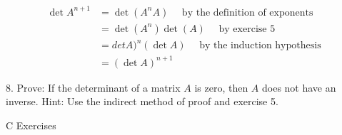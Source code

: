 \documentclass[10pt,]{book}
\theoremstyle{plain}
\theoremstyle{definition}
\theoremstyle{definition}
\theoremstyle{definition}
\theoremstyle{definition}
\begin{document}
\begin{exercisegroup}
\begin{equation*}
\begin{split}
 \det  A^{n+1} & =\det \left(A^nA\right)\quad \textrm{ by the definition of exponents}\\
   &=\det \left(A^n\right)\det (A)\quad \textrm{ by exercise 5} \\
   &=det  A)^n(\det  A)\quad \textrm{ by the induction hypothesis }\\
  &=(\det  A)^{n+1}
\end{split}
\end{equation*}
%
\item[8.]\hypertarget{exercise-15}{}Prove: If the determinant of a matrix \(A\) is zero, then \(A\) does not have an inverse. Hint: Use the indirect method of proof and exercise 5.%
\par\smallskip
\end{exercisegroup}
\par\smallskip\noindent
\hypertarget{exercisegroup-5}{}\typeout{************************************************}
\typeout{************************************************}
C Exercises%
\end{document}
